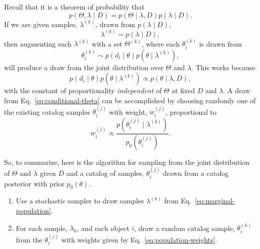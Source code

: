 \documentclass[modern]{aastex63}
\begin{document}
Recall that it is a theorem of probability that
%
\begin{equation}
  \label{eq:joint-conditional-relation}
  p\left( \Theta, \lambda \mid D \right) = p\left( \Theta \mid \lambda, D \right) p\left( \lambda \mid D \right).
\end{equation}
If we are given samples, $\lambda^{(k)}$, drawn from $p\left( \lambda \mid D \right)$,
%
\begin{equation}
  \lambda^{(k)} \sim p\left( \lambda \mid D \right),
\end{equation}
%
then augmenting each $\lambda^{(k)}$ with a set $\Theta^{(k)}$, where each $\theta_i^{(k)}$
is drawn from
%
\begin{equation}
  \label{eq:conditional-theta}
  \theta_i^{(k)} \sim p\left( d_i \mid \theta \right) p\left( \theta \mid \lambda^{(k)} \right),
\end{equation}
%
will produce a draw from the joint distribution over $\Theta$ and $\lambda$.
This works because
%
\begin{equation}
  p\left( d_i \mid \theta \right) p\left( \theta \mid \lambda^{(k)} \right) \propto p\left( \theta \mid \lambda, D \right),
\end{equation}
%
with the constant of proportionality \emph{independent} of $\Theta$ at fixed $D$
and $\lambda$.  A draw from Eq.\ \eqref{eq:conditional-theta} can be
accomplished by choosing randomly one of the existing catalog samples
$\theta_i^{(j)}$ with weight, $w_i^{(j)}$, proportional to \citep{Hogg2010}
%
\begin{equation}
  \label{eq:population-weights}
  w_i^{(j)} \propto \frac{p\left( \theta_i^{(j)} \mid \lambda^{(k)} \right)}{p_0 \left( \theta_i^{(j)} \right)}.
\end{equation}

So, to summarize, here is the algorithm for sampling from the joint distribution
of $\Theta$ and $\lambda$ given $D$ and a catalog of samples, $\theta_i^{(j)}$
drawn from a catalog posterior with prior $p_0\left(\theta\right)$.
\begin{enumerate}
%
  \item Use a stochastic sampler to draw samples $\lambda^{(k)}$ from Eq.\ \eqref{eq:marginal-population}.
%
  \item For each sample, $\lambda_k$, and each object $i$, draw a random catalog
  sample, $\theta_i^{(k)}$ from the $\theta_i^{(j)}$ with weights given by Eq.\
  \eqref{eq:population-weights}.
%
\end{enumerate}
\end{document}
